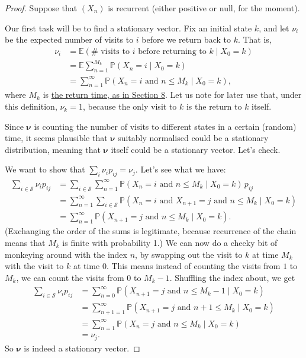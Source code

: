 \documentclass[
  a4paper,
]{article}
\theoremstyle{definition}
\theoremstyle{definition}
\theoremstyle{definition}
\theoremstyle{remark}
\begin{document}
\begin{proof}

Suppose that \((X_n)\) is recurrent (either positive or null, for the moment).

Our first task will be to find a stationary vector. Fix an initial state \(k\), and let \(\nu_i\) be the expected number of visits to \(i\) before we return back to \(k\). That is,
\begin{align*}
\nu_i &= \mathbb E (\# \text{ visits to $i$ before returning to $k$} \mid X_0 = k) \\
      &= \mathbb E \sum_{n=1}^{M_k} \mathbb P(X_n = i \mid X_0 = k) \\
      &= \sum_{n=1}^\infty \mathbb P(X_n = i \text{ and } n \leq M_k \mid X_0 = k)  ,
\end{align*}
where \(M_k\) is \protect\hyperlink{S08-return-times}{the return time, as in Section 8}.
Let us note for later use that, under this definition, \(\nu_k = 1\), because the only visit to \(k\) is the return to \(k\) itself.

Since \(\boldsymbol\nu\) is counting the number of visits to different states in a certain (random) time, it seems plausible that \(\boldsymbol\nu\) suitably normalised could be a stationary distribution, meaning that \(\boldsymbol\nu\) itself could be a stationary vector. Let's check.

We want to show that \(\sum_i \nu_i p_{ij} = \nu_j\). Let's see what we have:
\begin{align*}
\sum_{i \in \mathcal S} \nu_i p_{ij} &= \sum_{i \in \mathcal S} \sum_{n=1}^\infty \mathbb P(X_n = i \text{ and } n \leq M_k \mid X_0 = k) \, p_{ij} \\
&= \sum_{n=1}^\infty \sum_{i \in \mathcal S} \mathbb P(X_n = i \text{ and } X_{n+1} = j \text{ and } n \leq M_k \mid X_0 = k) \\
&= \sum_{n=1}^\infty \mathbb P(X_{n+1} = j \text{ and } n \leq M_k \mid X_0 = k) .
\end{align*}
(Exchanging the order of the sums is legitimate, because recurrence of the chain means that \(M_k\) is finite with probability 1.)
We can now do a cheeky bit of monkeying around with the index \(n\), by swapping out the visit to \(k\) at time \(M_k\) with the visit to \(k\) at time \(0\). This means instead of counting the visits from \(1\) to \(M_k\), we can count the visits from \(0\) to \(M_k - 1\). Shuffling the index about, we get
\begin{align*}
\sum_{i \in \mathcal S} \nu_i p_{ij} &= \sum_{n=0}^\infty \mathbb P(X_{n+1} = j \text{ and } n \leq M_k-1 \mid X_0 = k) \\
&= \sum_{n+1=1}^\infty \mathbb P(X_{n+1} = j \text{ and } n+1 \leq M_k \mid X_0 = k) \\
&= \sum_{n=1}^\infty \mathbb P(X_{n} = j \text{ and } n \leq M_k \mid X_0 = k) \\
&= \nu_j .
\end{align*}
So \(\boldsymbol\nu\) is indeed a stationary vector.


\end{proof}
\end{document}
